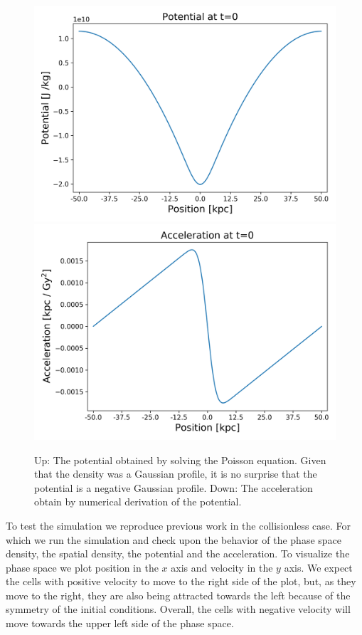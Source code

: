 \begin{figure}[h!]
    \centering
    \includegraphics[scale=0.6]{imag/1dInitPot.png}
    \includegraphics[scale=0.6]{imag/1dInitAcce.png}
    \caption{Up: The potential obtained by solving the Poisson equation. Given that the density was a Gaussian profile, it is no surprise that the potential is a negative Gaussian profile. Down: The acceleration obtain by numerical derivation of the potential.}
    \label{1dInit2}
\end{figure}

To test the simulation we reproduce previous work in the collisionless case. For which we run the simulation and check upon the behavior of the phase space density, the spatial density, the potential and the acceleration. 
To visualize the phase space we plot position in the $x$ axis and velocity in the $y$ axis. We expect the cells with positive velocity to move to the right side of the plot, but, as they move to the right, they are also being attracted towards the left because of the symmetry of the initial conditions. Overall, the cells with negative velocity will move towards the upper left side of the phase space. %


